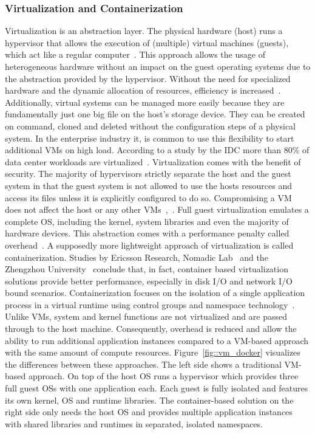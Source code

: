         \subsubsection{Virtualization and Containerization}\label{sssec::virtual}
        Virtualization is an abstraction layer. The physical hardware (host) runs a hypervisor that allows the execution of (multiple) virtual machines (guests), which act like a regular computer~\cite{vmbasics}. This approach allows the usage of heterogeneous hardware without an impact on the guest operating systems due to the abstraction provided by the hypervisor. Without the need for specialized hardware and the dynamic allocation of resources, efficiency is increased~\cite{redhat_venv}. Additionally, virtual systems can be managed more easily because they are fundamentally just one big file on the host's storage device. They can be created on command, cloned and deleted without the configuration steps of a physical system. In the enterprise industry it, is common to use this flexibility to start additional \ac{VM}s on high load. According to a study by the \ac{IDC} more than 80\% of data center workloads are virtualized~\cite{virtualaddoption}. Virtualization comes with the benefit of security. The majority of hypervisors strictly separate the host and the guest system in that the guest system is not allowed to use the hosts resources and access its files unless it is explicitly configured to do so. Compromising a \ac{VM} does not affect the host or any other \ac{VM}s~\cite{vmbasics},~\cite{redhat_venv}.\newline
        Full guest virtualization emulates a complete \ac{OS}, including the kernel, system libraries and even the majority of hardware devices. This abstraction comes with a performance penalty called overhead~\cite{vmbasics}. A supposedly more lightweight approach of virtualization is called containerization. Studies by Ericsson Research, Nomadic Lab~\cite{ieee_perfomance} and the Zhengzhou University~\cite{zhengzhou_university} conclude that, in fact, container based virtualization solutions provide better performance, especially in disk \acs{I/O} and network \acs{I/O} bound scenarios. Containerization focuses on the isolation of a single application process in a virtual runtime using control groups and namespace technology~\cite{cgroups}. Unlike \ac{VM}s, system and kernel functions are not virtualized and are passed through to the host machine. Consequently, overhead is reduced and allow the ability to run additional application instances compared to a \ac{VM}-based approach with the same amount of compute resources. Figure~\ref{fig::vm_docker} visualizes the differences between these approaches. The left side shows a traditional \ac{VM}-based approach. On top of the host \ac{OS} runs a hypervisor which provides three full guest \acl{OS}s with one application each. Each guest is fully isolated and features its own kernel, \ac{OS} and runtime libraries. The container-based solution on the right side only needs the host \ac{OS} and provides multiple application instances with shared libraries and runtimes in separated, isolated namespaces.\newline

